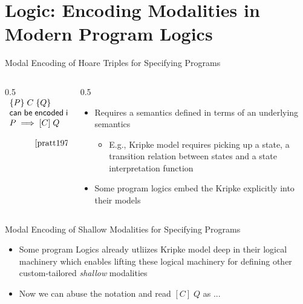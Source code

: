\documentclass[aspectratio=169,xcolor=dvipsnames]{beamer}
\newcommand{\makepart}[1]{ %
\part{#1} \frame{\partpage}
}
\begin{document}
\makepart{Logic: Encoding Modalities in Modern Program Logics}
\begin{frame}{Modal Encoding of Hoare Triples for Specifying Programs}
\begin{columns}
    \begin{column}{0.5\textwidth}
    $
    \begin{array}{l}
        \{P\}\; C\; \{Q\} \\ 
        \mathsf{can}\; \mathsf{be}\; \mathsf{encoded}\; \mathsf{in}\; \mathsf{terms}\; \mathsf{of} \\
        P \implies [C] \; Q  \\ \quad \\ \quad\quad\quad\cite{pratt1976semantical}
        
    \end{array}
    $
    \end{column}
    \begin{column}{0.5\textwidth}
        \begin{itemize}
            \item Requires a semantics defined in terms of an underlying semantics
            \begin{itemize}
                \item E.g., Kripke model requires picking up a state, a transition relation between states and a state interpretation function 
            \end{itemize}
            \item Some program logics embed the Kripke explicitly into their models \cite{gordon2019modal} \cite{amalreal2024}
            \end{itemize}
    \end{column}
\end{columns}
   
\end{frame}
\begin{frame}{Modal Encoding of Shallow Modalities for Specifying Programs}
     \begin{itemize}
            \item Some program Logics already utliizes Kripke model deep in their logical machinery \cite{jung15, jung2018iris} which enables lifting these logical machinery for defining other custom-tailored \emph{shallow} modalities
            \item Now we can abuse the notation and read  $[C] \; Q$ as ...  
            \end{itemize}   
\end{frame}
    \scriptsize
    
    

\end{document}

